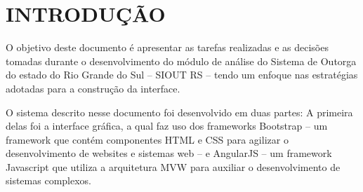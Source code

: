 \chapter{INTRODUÇÃO}

O objetivo deste documento é apresentar as tarefas realizadas e as decisões tomadas durante o desenvolvimento do módulo de análise do Sistema de Outorga do estado do Rio Grande do Sul -- SIOUT RS -- tendo um enfoque nas estratégias adotadas para a construção da interface.

O sistema descrito nesse documento foi desenvolvido em duas partes: A primeira delas foi a interface gráfica, a qual faz uso dos frameworks Bootstrap -- um framework que contém componentes HTML e CSS para agilizar o desenvolvimento de websites e sistemas web -- e AngularJS -- um framework Javascript que utiliza a arquitetura MVW \cite{branas2014angularjs} para auxiliar o desenvolvimento de sistemas complexos.